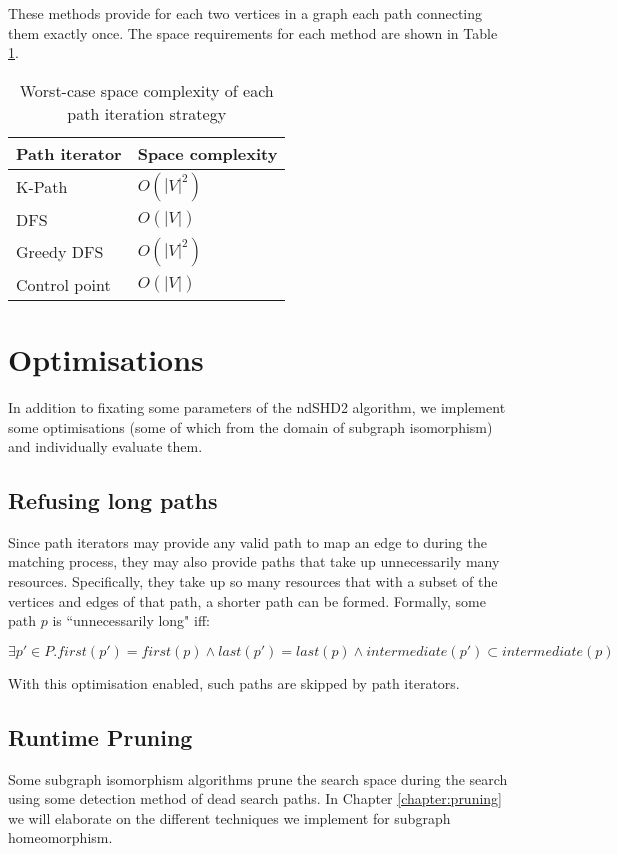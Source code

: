 These methods provide for each two vertices in a graph each path connecting them exactly once. The space requirements for each method are shown in Table \ref{tab:iterator-spacerequirements}.

\begin{table}[]
\centering
\begin{tabular}{|l|l|}
\hline
\textbf{Path iterator} & \textbf{Space complexity} \\ \hline
K-Path                 & $O(|V|^2)$                \\ \hline
DFS                    & $O(|V|)$                  \\ \hline
Greedy DFS             & $O(|V|^2)$                \\ \hline
Control point          & $O(|V|)$                  \\ \hline
\end{tabular}
\caption{Worst-case space complexity of each path iteration strategy}
\label{tab:iterator-spacerequirements}
\end{table}

\section{Optimisations}
In addition to fixating some parameters of the ndSHD2 algorithm, we implement some optimisations (some of which from the domain of subgraph isomorphism) and individually evaluate them.

\subsection{Refusing long paths}
Since path iterators may provide any valid path to map an edge to during the matching process, they may also provide paths that take up unnecessarily many resources. Specifically, they take up so many resources that with a subset of the vertices and edges of that path, a shorter path can be formed. Formally, some path $p$ is ``unnecessarily long" iff:


$\exists p' \in P . first(p') = first(p) \land last(p') = last(p) \land intermediate(p') \subset intermediate(p)$

With this optimisation enabled, such paths are skipped by path iterators.

\subsection{Runtime Pruning}
Some subgraph isomorphism algorithms\cite{Cordella2004, McCreesh2015} prune the search space during the search using some detection method of dead search paths. In Chapter \ref{chapter:pruning} we will elaborate on the different techniques we implement for subgraph homeomorphism.


